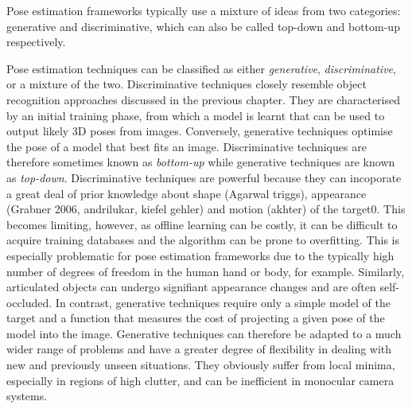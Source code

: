 Pose estimation frameworks typically use a mixture of ideas from two categories: generative and discriminative, which can also be called top-down and bottom-up respectively. 

Pose estimation techniques can be classified as either \textit{generative}, \textit{discriminative}, or a mixture of the two. Discriminative techniques closely resemble object recognition approaches discussed in the previous chapter. They are characterised by an initial training phase, from which a model is learnt that can be used to output likely 3D poses from images. Conversely, generative techniques optimise the pose of a model that best fits an image. Discriminative techniques are therefore sometimes known as \textit{bottom-up} while generative techniques are known as \textit{top-down}. Discriminative techniques are powerful because they can incoporate a great deal of prior knowledge about shape (Agarwal triggs), appearance (Grabner 2006, andrilukar, kiefel gehler) and motion (akhter) of the target0. This becomes limiting, however, as offline learning can be costly, it can be difficult to acquire training databases and the algorithm can be prone to overfitting. This is especially problematic for pose estimation frameworks due to the typically high number of degrees of freedom in the human hand or body, for example. Similarly, articulated objects can undergo signifiant appearance changes and are often self-occluded. In contrast, generative techniques require only a simple model of the target and a function that measures the cost of projecting a given pose of the model into the image. Generative techniques can therefore be adapted to a much wider range of problems and have a greater degree of flexibility in dealing with new and previously unseen situations. They obviously suffer from local minima, especially in regions of high clutter, and can be inefficient in monocular camera systems. 

